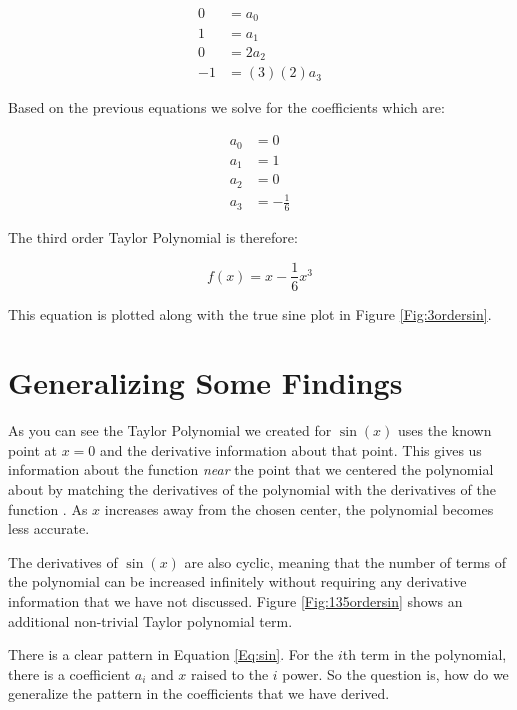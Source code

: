 \documentclass{../../KDHnotes}
\begin{document}
\begin{align}
  0 &= a_0\\ 
  1  &=a_1 \\
  0 &=2a_2\\
  -1 &=(3)(2)a_3
\end{align}

Based on the previous equations we solve for the coefficients which are:

\begin{align*}
  a_0&=0 \\ a_1&=1 \\ a_2&=0 \\ a_3&=-\frac{1}{6}
\end{align*}

The third order Taylor Polynomial is therefore:

\begin{equation}
  f(x) = x - \frac{1}{6}x^3
\end{equation}

 This equation is plotted along with the true sine plot in Figure \ref{Fig:3ordersin}.


\section{Generalizing Some Findings}
As you can see the Taylor Polynomial we created for $\sin(x)$ uses the known point at $x=0$ and the derivative information about that point. This gives us information about the function \textit{near} the point that we centered the polynomial about by matching the derivatives of the polynomial with the derivatives of the function \cite{3Brown1Blue-taylorseries}. As $x$ increases away from the chosen center, the polynomial becomes less accurate.

The derivatives of $\sin(x)$ are also cyclic, meaning that the number of terms of the polynomial can be increased infinitely without requiring any derivative information that we have not discussed. Figure \ref{Fig:135ordersin} shows an additional non-trivial Taylor polynomial term.


There is a clear pattern in Equation \ref{Eq:sin}. For the $i$th term in the polynomial, there is a coefficient $a_i$ and $x$ raised to the $i$ power. So the question is, how do we generalize the pattern in the coefficients that we have derived. 
\end{document}
